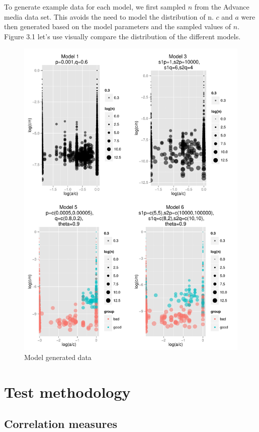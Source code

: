 \documentclass[11pt,a4,singlespacing,titlepagenumber=on]{scrreprt}
\numberwithin{equation}{chapter} %
\theoremstyle{remark}
\begin{document}
To generate example data for each model, we first sampled $n$ from the Advance media data set. This avoids the need to model the distribution of n. $c$ and $a$ were then generated based on the model parameters and the sampled values of $n$. Figure 3.1 let's use visually compare the distribution of the different models.

\begin{figure}[H]
    	\centering
	\includegraphics[scale=0.7]{SynthData}
    	\caption{Model generated data}
\end{figure}




\section{Test methodology} 

\subsection{ Correlation measures}
\end{document}
